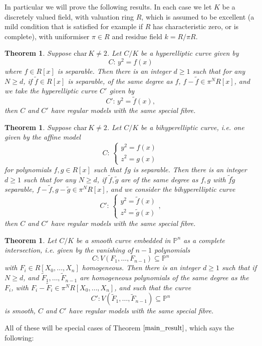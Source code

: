 \documentclass{article}
\theoremstyle{definition}
\theoremstyle{plain}
\newtheorem{thm}[defn]{Theorem}
\theoremstyle{remark}
\newcommand{\ch}{\mathrm{char}\,}
\begin{document}
	In particular we will prove the following results. In each case we let $K$ be a discretely valued field, with valuation ring $R$, which is assumed to be excellent (a mild condition that is satisfied for example if $R$ has characteristic zero, or is complete), with uniformiser $\pi\in R$ and residue field $k = R/\pi R$.
	\begin{thm}\label{intro_hyperelliptic}
		Suppose $\ch K \not=2$. Let $C/K$ be a hyperelliptic curve given by
		\[C:\,y^2 = f(x)\]
		where $f\in R[x]$ is separable. Then there is an integer $d\ge 1$ such that for any $N\ge d$, if $\widetilde{f}\in R[x]$ is separable, of the same degree as $f$, $f-\widetilde{f}\in \pi^N R[x]$, and we take the hyperelliptic curve $C'$ given by
		\[C':\,y^2 = \widetilde{f}(x),\]
		then $C$ and $C'$ have regular models with the same special fibre.
	\end{thm}
	\begin{thm}\label{intro_bihyperelliptic}
		Suppose $\ch K \not= 2$. Let $C/K$ be a bihyperelliptic curve, i.e. one given by the affine model
		\[C:\,\begin{cases}
			y^2 = f(x)\\
			z^2 = g(x)
		\end{cases}\]
		for polynomials $f,g\in R[x]$ such that $fg$ is separable. Then there is an integer $d\ge 1$ such that for any $N\ge d$, if $\widetilde{f}, \widetilde{g}$ are of the same degree as $f,g$ with $\widetilde{f}\widetilde{g}$ separable, $f-\widetilde{f}, g-\widetilde{g} \in \pi^N R[x]$, and we consider the bihyperelliptic curve 
		\[C':\,\begin{cases}
			y^2 = \widetilde{f}(x)\\
			z^2 = \widetilde{g}(x)
		\end{cases},\]
		then $C$ and $C'$ have regular models with the same special fibre.
	\end{thm}
	\begin{thm}\label{intro_projective}
		Let $C/K$ be a smooth curve embedded in $\mathbb{P}^n$ as a complete intersection, i.e. given by the vanishing of $n-1$ polynomials
		\[C: V(F_1, \ldots, F_{n-1}) \subseteq \mathbb{P}^n\]
		with $F_i\in R[X_0, \ldots, X_n]$ homogeneous. Then there is an integer $d\ge 1$ such that if $N\ge d$, and $\widetilde{F}_1, \ldots, \widetilde{F}_{n-1}$ are homogeneous polynomials of the same degree as the $F_i$, with $F_i-\widetilde{F}_i\in \pi^NR[X_0, \ldots, X_n]$, and such that the curve
		\[C': V(\widetilde{F}_1, \ldots, \widetilde{F}_{n-1}) \subseteq \mathbb{P}^n\]
		is smooth, $C$ and $C'$ have regular models with the same special fibre.	
	\end{thm}
	All of these will be special cases of Theorem $\ref{main_result}$, which says the following:
	
\end{document}
